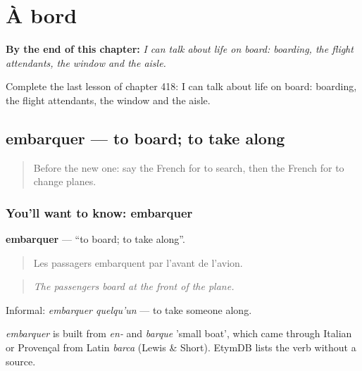 
\chapter{À bord}
\label{ch:fr-a-bord}

\begin{chapteropening}
\textbf{By the end of this chapter:} \emph{I can talk about life on board: boarding, the flight attendants, the window and the aisle.}

Complete the last lesson of chapter 418: I can talk about life on board: boarding, the flight attendants, the window and the aisle.
\end{chapteropening}

\section[embarquer]{embarquer — to board; to take along}

\label{lesson:FR-C418-embarquer}



\begin{quote}
Before the new one: say the French for to search, then the French for to change planes.
\end{quote}

\subsection*{You'll want to know: embarquer}
\textbf{embarquer} — \textquotedblleft{}to board; to take along\textquotedblright{}.

\begin{quote}
Les passagers embarquent par l'avant de l'avion.
\end{quote}

\begin{quote}
\emph{The passengers board at the front of the plane.}
\end{quote}

Informal: \emph{embarquer quelqu'un} — to take someone along.

\begin{cousinweb}
\emph{embarquer} is built from \emph{en-} and \emph{barque} 'small boat', which came through Italian or Provençal from Latin \emph{barca} (Lewis \& Short). EtymDB lists the verb without a source.
\end{cousinweb}

